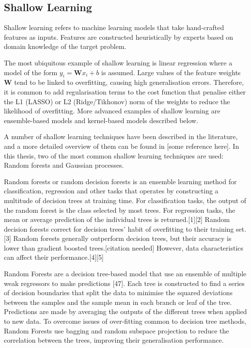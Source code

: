 \subsection{Shallow Learning}

Shallow learning refers to machine learning models that take hand-crafted features as inputs. Features are constructed heuristically by experts based on domain knowledge of the target problem. 

The most ubiquitous example of shallow learning is linear regression where a model of the form $y_{i} = \textbf{W}x_{i} + b$ is assumed. Large values of the feature weights $\textbf{W}$ tend to be linked to overfitting, causing high generalisation errors. Therefore, it is common to add regularisation terms to the cost function that penalise either the L1 (LASSO) or L2 (Ridge/Tikhonov) norm of the weights to reduce the likelihood of overfitting. More advanced examples of shallow learning are ensemble-based models and kernel-based models described below.

A number of shallow learning techniques have been described in the literature, and a more detailed overview of them can be found in [some reference here]. In this thesis, two of the most common shallow learning techniques are used: Random forests and Gaussian processes.

Random forests or random decision forests is an ensemble learning method for classification, regression and other tasks that operates by constructing a multitude of decision trees at training time. For classification tasks, the output of the random forest is the class selected by most trees. For regression tasks, the mean or average prediction of the individual trees is returned.[1][2] Random decision forests correct for decision trees' habit of overfitting to their training set.[3] Random forests generally outperform decision trees, but their accuracy is lower than gradient boosted trees.[citation needed] However, data characteristics can affect their performance.[4][5]

Random Forests are a decision tree-based model that use an ensemble of multiple weak regressors to make predictions [47]. Each tree is constructed to find a series of decision boundaries that split the data to minimise the squared deviations between the samples and the sample mean in each branch or leaf of the tree. Predictions are made by averaging the outputs of the different trees when applied to new data. To overcome issues of over-fitting common to decision tree methods, Random Forests use bagging and random subspace projection to reduce the correlation between the trees, improving their generalisation performance. 


